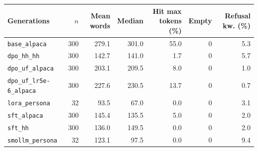 \begin{tabular}{lrrrrrr}
\toprule
Generations & $n$ & Mean words & Median & Hit max tokens (\%) & Empty & Refusal kw. (\%) \\
\midrule
\texttt{base\_alpaca} & 300 & 279.1 & 301.0 & 55.0 & 0 & 5.3 \\
\texttt{dpo\_hh\_hh} & 300 & 142.7 & 141.0 & 1.7 & 0 & 5.7 \\
\texttt{dpo\_uf\_alpaca} & 300 & 203.1 & 209.5 & 8.0 & 0 & 1.0 \\
\texttt{dpo\_uf\_lr5e-6\_alpaca} & 300 & 227.6 & 230.5 & 13.7 & 0 & 0.7 \\
\texttt{lora\_persona} & 32 & 93.5 & 67.0 & 0.0 & 0 & 3.1 \\
\texttt{sft\_alpaca} & 300 & 145.4 & 135.5 & 5.0 & 0 & 2.0 \\
\texttt{sft\_hh} & 300 & 136.0 & 149.5 & 0.0 & 0 & 2.0 \\
\texttt{smollm\_persona} & 32 & 123.1 & 97.5 & 0.0 & 0 & 9.4 \\
\bottomrule
\end{tabular}
